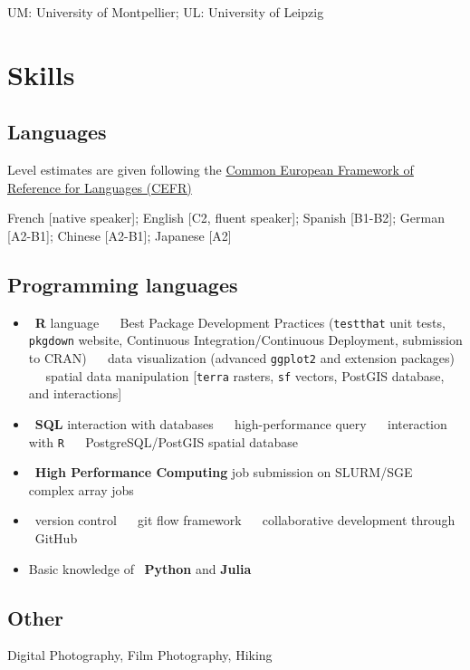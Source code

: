 \documentclass[10pt,a4paper,]{article}
\providecommand{\tightlist}{%
  \setlength{\itemsep}{0pt}\setlength{\parskip}{0pt}}
\begin{document}
UM: University of Montpellier; UL: University of Leipzig

\hypertarget{skills}{%
\section{Skills}\label{skills}}

\hypertarget{languages}{%
\subsection{Languages}\label{languages}}

Level estimates are given following the
\href{https://www.coe.int/en/web/portfolio/self-assessment-grid}{Common
European Framework of Reference for Languages (CEFR)}

French {[}native speaker{]}; English {[}C2, fluent speaker{]}; Spanish
{[}B1-B2{]}; German {[}A2-B1{]}; Chinese {[}A2-B1{]}; Japanese {[}A2{]}

\hypertarget{programming-languages}{%
\subsection{Programming languages}\label{programming-languages}}

\begin{itemize}
\tightlist
\item
  \faRProject~\textbf{R} language ~\textbullet~ Best Package Development
  Practices (\texttt{testthat} unit tests, \texttt{pkgdown} website,
  Continuous Integration/Continuous Deployment, submission to CRAN)
  ~\textbullet~ data visualization (advanced \texttt{ggplot2} and
  extension packages) ~\textbullet~ spatial data manipulation
  {[}\texttt{terra} rasters, \texttt{sf} vectors, PostGIS database, and
  interactions{]}
\item
  \faDatabase~\textbf{SQL} interaction with databases ~\textbullet~
  high-performance query ~\textbullet~ interaction with \texttt{R}
  ~\textbullet~ PostgreSQL/PostGIS spatial database
\item
  \faServer~\textbf{High Performance Computing} job submission on
  SLURM/SGE ~\textbullet~ complex array jobs
\item
  \faGit~version control ~\textbullet~ git flow framework ~\textbullet~
  collaborative development through \faGithub~GitHub
\item
  Basic knowledge of \faPython~\textbf{Python} and \textbf{Julia}
\end{itemize}

\hypertarget{other}{%
\subsection{Other}\label{other}}

Digital Photography, Film Photography, Hiking
\end{document}
